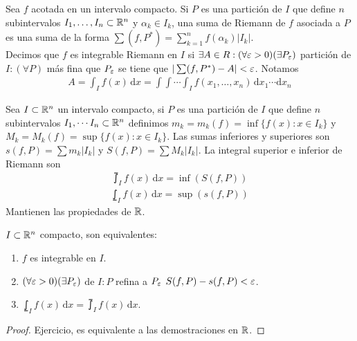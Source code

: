 \begin{definition}
  Sea \(f\) acotada en un intervalo compacto. Si \(P\) es una partición de \(I\) que define \(n\) subintervalos \(I_1, \ldots, I_n \subset \mathbb{R}^n\) y \(\alpha_k \in I_k\), una suma de Riemann de \(f\) asociada a \(P\) es una suma de la forma \(\sum (f, P^*) = \sum_{k = 1}^n f(\alpha_k) |I_k|\). \\
  Decimos que \(f\) es integrable Riemann en \(I\) si \(\exists A \in R : (\forall \varepsilon > 0)(\exists P_{\varepsilon})\) partición de \(I : (\forall P)\) más fina que \(P_{\varepsilon} \) se tiene que \(|\sum(f, P^*) - A| < \varepsilon \).
  Notamos \begin{align*}
    A =  \int_I f(x) \, \mathrm{d}x = \int \int \cdots \int_I f(x_1, \ldots, x_n)\, \mathrm{d}x_1 \cdots \mathrm{d}x_n
  \end{align*}
\end{definition}

\begin{definition}
  Sea \(I \subset \mathbb{R}^n\) un intervalo compacto, si \(P\) es una partición de \(I\) que define \(n\) subintervalos \(I_1, \cdots I_n \subset \mathbb{R}^n\) definimos \(m_k = m_k(f) = \inf \{ f(x) : x \in I_k\} \) y \(M_k = M_k(f) = \sup \{ f(x) : x \in I_k\} \).
  Las sumas inferiores y superiores son \(s(f, P) = \sum m_k |I_k|\) y \(S(f, P) = \sum M_k |I_k|\).
  La integral superior e inferior de Riemann son \begin{align*}
    \upint_I f(x) \, \mathrm{d}x = \inf(S(f, P))
  \end{align*}
  \begin{align*}
    \lowint_I f(x)\, \mathrm{d}x = \sup(s(f, P))
  \end{align*}
  Mantienen las propiedades de \(\mathbb{R} \).
\end{definition}

\begin{theorem}
  \(I \subset \mathbb{R}^n\) compacto, son equivalentes:
  \begin{enumerate}
    \item \(f\) es integrable en \(I\).
    \item \((\forall \varepsilon > 0)(\exists P_{\varepsilon})\) de \(I : P\) refina a \(P_{\varepsilon} \) \(S(f, P) - s(f, P) < \varepsilon \).
    \item \(\lowint_I f(x) \, \mathrm{d}x = \upint_I f(x) \, \mathrm{d}x\).
  \end{enumerate}
  \begin{proof}
    Ejercicio, es equivalente a las demostraciones en \(\mathbb{R} \).
  \end{proof}
\end{theorem}

